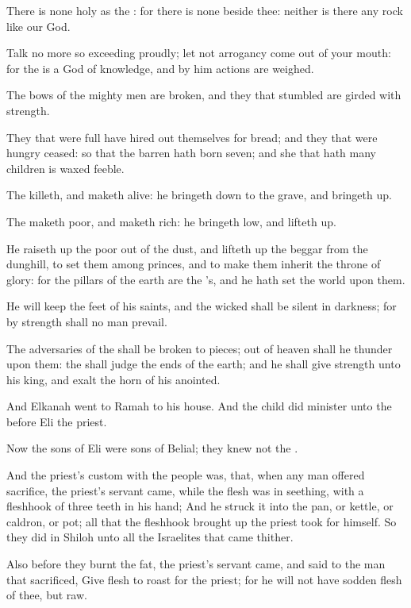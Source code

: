 \Verse There is none holy as the \LORD: for there is none beside thee: neither is there any rock like our God.

\Verse Talk no more so exceeding proudly; let not arrogancy come out of your mouth: for the \LORD is a God of knowledge, and by him actions are weighed.

\Verse The bows of the mighty men are broken, and they that stumbled are girded with strength.

\Verse They that were full have hired out themselves for bread; and they that were hungry ceased: so that the barren hath born seven; and she that hath many children is waxed feeble.

\Verse The \LORD killeth, and maketh alive: he bringeth down to the grave, and bringeth up.

\Verse The \LORD maketh poor, and maketh rich: he bringeth low, and lifteth up.

\Verse He raiseth up the poor out of the dust, and lifteth up the beggar from the dunghill, to set them among princes, and to make them inherit the throne of glory: for the pillars of the earth are the \LORD's, and he hath set the world upon them.

\Verse He will keep the feet of his saints, and the wicked shall be silent in darkness; for by strength shall no man prevail.

\Verse The adversaries of the \LORD shall be broken to pieces; out of heaven shall he thunder upon them: the \LORD shall judge the ends of the earth; and he shall give strength unto his king, and exalt the horn of his anointed.

\Verse And Elkanah went to Ramah to his house. And the child did minister unto the \LORD before Eli the priest.

\Verse Now the sons of Eli were sons of Belial; they knew not the \LORD.

\Verse And the priest's custom with the people was, that, when any man offered sacrifice, the priest's servant came, while the flesh was in seething, with a fleshhook of three teeth in his hand; \Verse And he struck it into the pan, or kettle, or caldron, or pot; all that the fleshhook brought up the priest took for himself. So they did in Shiloh unto all the Israelites that came thither.

\Verse Also before they burnt the fat, the priest's servant came, and said to the man that sacrificed, Give flesh to roast for the priest; for he will not have sodden flesh of thee, but raw.

